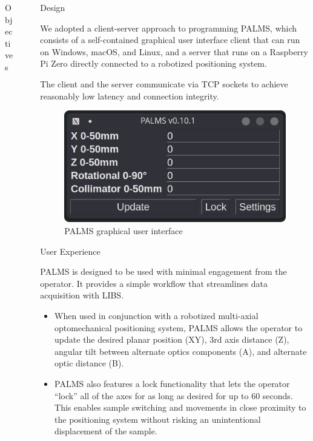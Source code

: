 \documentclass[final]{beamer}
\newlength{\sepwidth}
\newlength{\colwidth}
\newcommand{\separatorcolumn}{\begin{column}{\sepwidth}\end{column}}
\begin{document}
\begin{frame}[t]
\begin{columns}[t]
\begin{column}{\colwidth}
\begin{alertblock}{Objectives}
  \end{alertblock}

\end{column}

\separatorcolumn

\begin{column}{\colwidth}

  \begin{block}{Design}

    We adopted a client-server approach to programming PALMS\@, 
    which consists of a self-contained graphical user interface client that can run on 
    Windows, 
    macOS, 
    and Linux, 
    and a server that runs on a Raspberry Pi Zero 
    directly connected to a robotized positioning system.

    The client and the server communicate via TCP sockets to achieve reasonably low latency and connection integrity.

    \begin{figure}
      \centering
      \includegraphics[scale=0.8]{palms-gui}
      \caption{PALMS graphical user interface}
    \end{figure}

  \end{block}

  \begin{block}{User Experience}

    PALMS is designed to be used with minimal engagement from the operator.
    It provides a simple workflow that streamlines data acquisition with LIBS.

    \begin{itemize}
      \item When used in conjunction with a robotized multi-axial optomechanical positioning system, 
      PALMS allows the operator to update the 
      desired planar position (XY), 
      3rd axis distance (Z), 
      angular tilt between alternate optics components (A), 
      and alternate optic distance (B).
      \item PALMS also features a lock functionality that lets the operator \enquote{lock} all of the axes for as long as desired for up to 60 seconds. 
      This enables sample switching 
      and movements in close proximity to the positioning system without risking an unintentional displacement of the sample.


\end{itemize}
\end{block}
\end{column}
\end{columns}
\end{frame}
\end{document}
